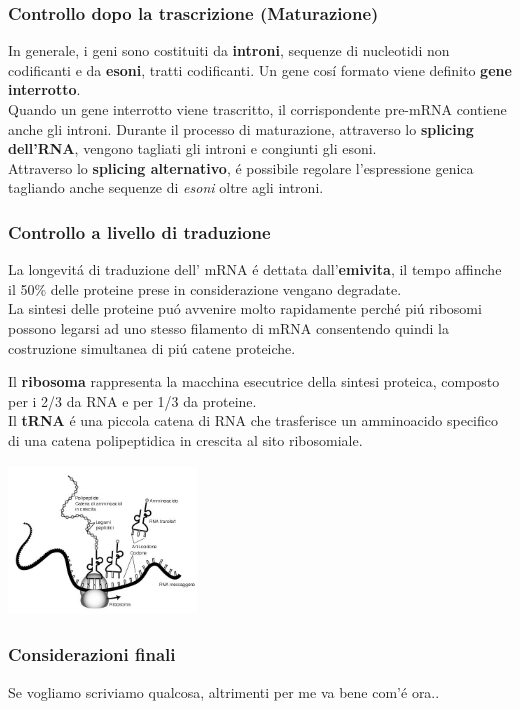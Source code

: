 \documentclass[hyperref={pdfpagelabels=false}]{beamer}
\begin{document}
\begin{frame}\frametitle{Controllo dopo la trascrizione (Maturazione)}
In generale, i geni sono costituiti da \textbf{introni}, sequenze di nucleotidi non codificanti e da \textbf{esoni}, tratti codificanti. Un gene cos\'i formato viene definito \textbf{gene interrotto}.\\
Quando un gene interrotto viene trascritto, il corrispondente pre-mRNA contiene anche gli introni. Durante il processo di maturazione, attraverso lo \textbf{splicing dell'RNA}, vengono tagliati gli introni e congiunti gli esoni.\\
Attraverso lo \textbf{splicing alternativo}, \'e possibile regolare l'espressione genica tagliando anche sequenze di \emph{esoni} oltre agli introni.
\end{frame}


\begin{frame}\frametitle{Controllo a livello di traduzione}
La longevit\'a di traduzione dell' mRNA \'e dettata dall'\textbf{emivita}, il tempo affinche il 50\% delle proteine prese in considerazione vengano degradate.\\
La sintesi delle proteine pu\'o avvenire molto rapidamente perch\'e pi\'u ribosomi possono legarsi ad uno stesso filamento di mRNA consentendo quindi la costruzione simultanea di pi\'u catene proteiche.
\begin{minipage}[c]{.5\textwidth}
Il \textbf{ribosoma} rappresenta la macchina esecutrice della sintesi proteica, composto per i 2/3 da RNA e per 1/3 da proteine.\\
Il \textbf{tRNA} \'e una piccola catena di RNA che trasferisce un amminoacido specifico di una catena polipeptidica in crescita al sito ribosomiale.
\end{minipage}
\begin{minipage}[c]{.45\textwidth}
\includegraphics[width=5cm,height=4cm]{traduzione.jpg}
\end{minipage}
\end{frame}


\begin{frame}\frametitle{Considerazioni finali}
Se vogliamo scriviamo qualcosa, altrimenti per me va bene com'\'e ora..
\end{frame}
\end{document}
